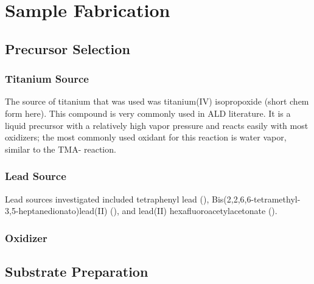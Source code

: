 \chapter{Sample Fabrication}
\label{ch:SampFab}
\thispagestyle{empty}



\section{Precursor Selection}
\label{sect:SampFab-Precursor}

\lipsum

\subsection{Titanium Source}

The source of titanium that was used was titanium(IV) isopropoxide (short chem form here). This compound is very commonly used in ALD literature. It is a liquid precursor with a relatively high vapor pressure and reacts easily with most oxidizers; the most commonly used oxidant for this reaction is water vapor, similar to the TMA- reaction.  

\subsection{Lead Source}

Lead sources investigated included tetraphenyl lead (), Bis(2,2,6,6-tetramethyl-3,5-heptanedionato)lead(II) (), and lead(II) hexafluoroacetylacetonate (). 

\subsection{Oxidizer}

\lipsum


\section{Substrate Preparation}
\label{sec:SampFab-Substrates}

